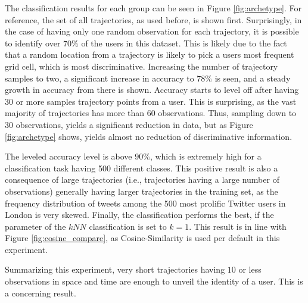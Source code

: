 The classification results for each group can be seen in Figure \ref{fig:archetype}. For reference, the set of all trajectories, as used before, is shown first. Surprisingly, in the case of having only one random observation for each trajectory, it is possible to identify over $70\%$ of the users in this dataset. This is likely due to the fact that a random location from a trajectory is likely to pick a users most frequent grid cell, which is most discriminative. Increasing the number of trajectory samples to two, a significant increase in accuracy to $78\%$ is seen, and a steady growth in accuracy from there is shown. Accuracy starts to level off after having 30 or more samples trajectory points from a user. This is surprising, as the vast majority of trajectories has more than 60 observations. Thus, sampling down to 30 observations, yields a significant reduction in data, but as Figure \ref{fig:archetype} shows, yields almost no reduction of discriminative information.

The leveled accuracy level is above $90\%$, which is extremely high for a classification task having 500 different classes. This positive result is also a consequence of large trajectories (i.e., trajectories having a large number of observations) generally having larger trajectories in the training set, as the frequency distribution of tweets among the 500 most prolific Twitter users in London is very skewed. Finally, the classification performs the best, if the parameter of the $kNN$ classification is set to $k=1$. This result is in line with Figure \ref{fig:cosine_compare}, as Cosine-Similarity is used per default in this experiment.

Summarizing this experiment, very short trajectories having $10$ or less observations in space and time are enough to unveil the identity of a user. This is a concerning result.
